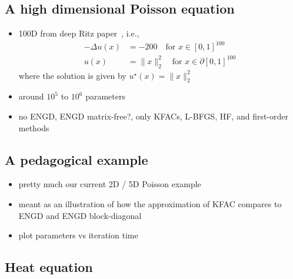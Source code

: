 \subsection{A high dimensional Poisson equation}

\begin{itemize}
    \item 100D from deep Ritz paper~\citep{yu2018deep}, i.e.,
    \begin{align*}
        -\Delta u(x) & = -200 \quad \text{for } x\in [0,1]^{100} \\
        u(x) & = \lVert x \rVert_2^2 \quad \text{for } x\in \partial[0,1]^{100}
    \end{align*}
    where the solution is given by $u^\star(x) = \lVert x \rVert_2^2$
    \item around $10^5$ to $10^6$ parameters
    \item no ENGD, ENGD matrix-free?, only KFACs, L-BFGS, HF, and first-order methods
\end{itemize}

\subsection{A pedagogical example}

\begin{itemize}
    \item pretty much our current 2D / 5D Poisson example
    \item meant as an illustration of how the approximation of KFAC compares to ENGD and ENGD block-diagonal
    \item plot parameters vs iteration time
\end{itemize}

\subsection{Heat equation}

